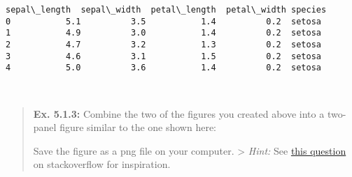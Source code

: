 \documentclass[11pt]{article}
\begin{document}
    \begin{Verbatim}[commandchars=\\\{\}]
   sepal\_length  sepal\_width  petal\_length  petal\_width species
0           5.1          3.5           1.4          0.2  setosa
1           4.9          3.0           1.4          0.2  setosa
2           4.7          3.2           1.3          0.2  setosa
3           4.6          3.1           1.5          0.2  setosa
4           5.0          3.6           1.4          0.2  setosa

    \end{Verbatim}

    \begin{center}
    \end{center}
    { \hspace*{\fill} \\}
    
    \begin{quote}
\textbf{Ex. 5.1.3:} Combine the two of the figures you created above
into a two-panel figure similar to the one shown here:

Save the figure as a png file on your computer. \textgreater{}
\emph{Hint:} See
\href{https://stackoverflow.com/questions/41384040/subplot-for-seaborn-boxplot}{this
question} on stackoverflow for inspiration.
\end{quote}
\end{document}

